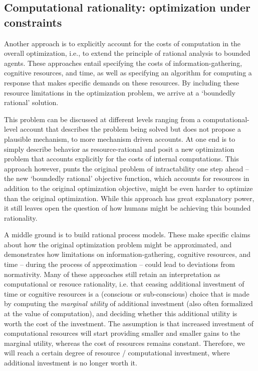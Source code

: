 \subsection{Computational rationality: optimization under constraints}

Another approach is to explicitly account for the costs of computation in the overall optimization, i.e., to extend the principle of rational analysis to bounded agents.
These approaches entail specifying the costs of information-gathering, cognitive resources, and time, as well as specifying an algorithm for computing a response that makes specific demands on these resources. By including these resource limitations in the optimization problem, we arrive at a `boundedly rational' solution.

This problem can be discussed at different levels ranging from a computational-level account that describes the problem being solved but does not propose a plausible mechanism, to more mechanism driven accounts. At one end is to simply describe behavior as resource-rational \citep{Vul2014, schulz2016simple} and posit a new optimization problem that accounts explicitly for the costs of internal computations. This approach however, punts the original problem of intractability one step ahead -- the new `boundedly rational' objective function, which accounts for resources in addition to the original optimization objective, might be even harder to optimize than the original optimization. While this approach has great explanatory power, it still leaves open the question of how humans might be achieving this bounded rationality.

A middle ground is to build rational process models\citep{griffiths2015, sanborn2010rational, dasgupta2017hypotheses}. These make specific claims about how the original optimization problem might be approximated, and demonstrates how limitations on information-gathering, cognitive resources, and time -- during the process of approximation -- could lead to deviations from normativity. Many of these approaches still retain an interpretation as computational or resouce rationality, i.e. that ceasing additional investment of time or cognitive resources is a (conscious or sub-conscious) choice that is made by computing the \textit{marginal utility} of additional investment (also often formalized at the value of computation\citep{horvitz1989reflection}), and deciding whether this additional utility is worth the cost of the investment\cite{gershman15, griffiths2015}. The assumption is that increased investment of computational resources will start providing smaller and smaller gains to the marginal utility, whereas the cost of resources remains constant. Therefore, we will reach a certain degree of resource / computational investment, where additional investment is no longer worth it.

